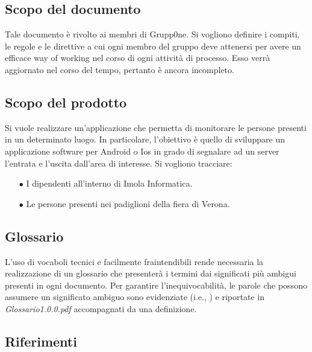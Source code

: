 \documentclass[../norme-di-progetto.tex]{subfiles}
\begin{document}
\subsection{Scopo del documento}
\label{sub:scopo del documento}
Tale documento è rivolto ai membri di Grupp0ne. Si vogliono definire i compiti, le regole e le direttive a cui ogni membro del gruppo deve attenersi per avere un efficace way of working nel corso di ogni attività di processo. Esso verrà aggiornato nel corso del tempo, pertanto è ancora incompleto. 


\subsection{Scopo del prodotto}
\label{sub:scopo del prodotto}
Si vuole realizzare un'applicazione che permetta di monitorare le persone presenti in un determinato luogo. In particolare, l'obiettivo è quello di sviluppare un applicazione software per Android o Ios in grado di segnalare ad un server l'entrata e l'uscita dall'area di interesse.
Si vogliono tracciare:
\begin{itemize}
	\item[$\bullet$]  I dipendenti all'interno di Imola Informatica.
	\item[$\bullet$] Le persone presenti nei padiglioni della fiera di Verona.
\end{itemize}

\subsection{Glossario}
\label{sub:glossario}
L'uso di vocaboli tecnici e facilmente fraintendibili rende necessaria la realizzazione di un glossario che presenterà i termini dai significati più ambigui presenti in ogni documento. Per garantire l'inequivocabilità, le parole che possono assumere un significato ambiguo sono evidenziate (i.e., ) e riportate in \textit{Glossario1.0.0.pdf} accompagnati da una definizione.

\subsection{Riferimenti}
\label{sub:riferimenti}
\end{document}
